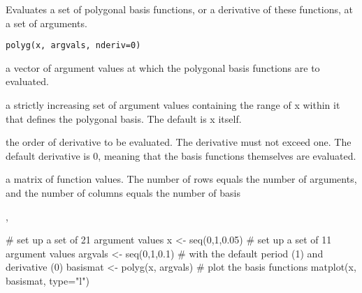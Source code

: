 \documentclass{article}
\begin{document}
\begin{Description}\relax
Evaluates a set of polygonal basis functions, or a derivative of these
functions, at a set of arguments.
\end{Description}
\begin{Usage}
\begin{verbatim}
polyg(x, argvals, nderiv=0)
\end{verbatim}
\end{Usage}
\begin{Arguments}
\begin{ldescription}
\item[\code{x}] a vector of argument values at which the polygonal basis functions are to
evaluated.

\item[\code{argvals}] a strictly increasing set of argument values containing the range of x
within it that defines the polygonal basis.  The default is x itself.

\item[\code{nderiv}] the order of derivative to be evaluated.  The derivative must not exceed
one.  The default derivative is 0, meaning that the basis functions
themselves are evaluated.

\end{ldescription}
\end{Arguments}
\begin{Value}
a matrix of function values.  The number of rows equals the number of
arguments, and the number of columns equals the number of basis
\end{Value}
\begin{SeeAlso}\relax
{}, 
\end{SeeAlso}
\begin{Examples}
\begin{ExampleCode}

#  set up a set of 21 argument values
x <- seq(0,1,0.05)
#  set up a set of 11 argument values
argvals <- seq(0,1,0.1)
#  with the default period (1) and derivative (0)
basismat <- polyg(x, argvals)
#  plot the basis functions
matplot(x, basismat, type="l")

\end{ExampleCode}
\end{Examples}
\end{document}
